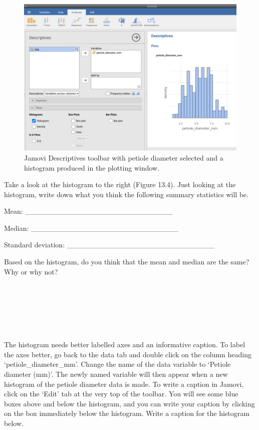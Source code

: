 \documentclass[
]{scrbook}
\begin{document}
\begin{figure}
\includegraphics[width=1\linewidth]{img/lilypad_histogram} \caption{Jamovi Descriptives toolbar with petiole diameter selected and a histogram produced in the plotting window.}\label{fig:unnamed-chunk-51}
\end{figure}

Take a look at the histogram to the right (Figure 13.4).
Just looking at the histogram, write down what you think the following summary statistics will be.

Mean: \_\_\_\_\_\_\_\_\_\_\_\_\_\_\_\_\_\_\_\_\_\_\_\_\_\_\_\_

Median: \_\_\_\_\_\_\_\_\_\_\_\_\_\_\_\_\_\_\_\_\_\_\_\_\_\_\_\_

Standard deviation: \_\_\_\_\_\_\_\_\_\_\_\_\_\_\_\_\_\_\_\_\_\_\_\_\_\_\_\_

Based on the histogram, do you think that the mean and median are the same? Why or why not?

\begin{verbatim}






\end{verbatim}

The histogram needs better labelled axes and an informative caption.
To label the axes better, go back to the data tab and double click on the column heading `petiole\_diameter\_mm'.
Change the name of the data variable to `Petiole diameter (mm)'.
The newly named variable will then appear when a new histogram of the petiole diameter data is made.
To write a caption in Jamovi, click on the `Edit' tab at the very top of the toolbar.
You will see some blue boxes above and below the histogram, and you can write your caption by clicking on the box immediately below the histogram.
Write a caption for the histogram below.
\end{document}
